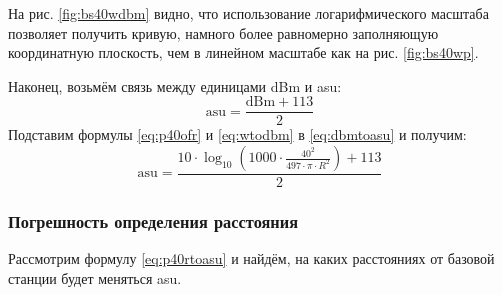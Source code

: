 На рис. \ref{fig:bs40wdbm} видно, что использование логарифмического масштаба позволяет получить кривую, намного более равномерно заполняющую координатную плоскость, чем в линейном масштабе как на рис. \ref{fig:bs40wp}.

Наконец, возьмём связь между единицами dBm и asu\cite{androidnecelinf}:
\begin{equation}
	\label{eq:dbmtoasu}
	\text{asu} = \frac{\text{dBm} + 113}{2}
\end{equation}
Подставим формулы \ref{eq:p40ofr} и \ref{eq:wtodbm} в \ref{eq:dbmtoasu} и получим:
\begin{equation}
	\label{eq:p40rtoasu}
	\text{asu} = \frac{10\cdot{}\log_{10}(1000\cdot{}\frac{40^2}{497\cdot{}\pi{}\cdot{}R^2}) + 113}{2}
\end{equation}

\subsubsection{Погрешность определения расстояния}
Рассмотрим формулу \ref{eq:p40rtoasu} и найдём, на каких расстояниях от базовой станции будет меняться asu.
